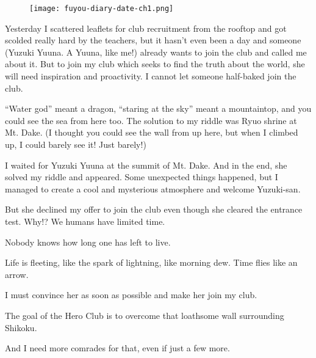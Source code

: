 \begin{center}
\begin{graphpaperBox}[enhanced,box align=center,colframe=diaryborder,top=0mm,left=0mm,boxsep=0mm,width=0.7\textwidth]
\begin{wrapfigure}{l}{0.25\textwidth}
\texttt{[image: fuyou-diary-date-ch1.png]}
\end{wrapfigure}
\hspace{\textheight}
\begin{addmargin}[1em]{0em}

Yesterday I scattered leaflets for club recruitment from the rooftop and got scolded really hard by the teachers, but it hasn't even been a day and someone (Yuzuki Yuuna. A Yuuna, like me!) already wants to join the club and called me about it. But to join my club which seeks to find the truth about the world, she will need inspiration and proactivity. I cannot let someone half-baked join the club.
\end{addmargin}

\begin{addmargin}[1em]{0em}
\setlength{\parskip}{6pt}

``Water god'' meant a dragon, ``staring at the sky'' meant a mountaintop, and you could see the sea from here too. The solution to my riddle was Ryuo shrine at Mt. Dake. \textleftarrow{} (I thought you could see the wall from up here, but when I climbed up, I could barely see it! Just barely!)

I waited for Yuzuki Yuuna at the summit of Mt. Dake. And in the end, she solved my riddle and appeared. Some unexpected things happened, but I managed to create a cool and mysterious atmosphere and welcome Yuzuki-san.

But she declined my offer to join the club even though she cleared the entrance test. Why!? We humans have limited time.

Nobody knows how long one has left to live.

Life is fleeting, like the spark of lightning, like morning dew. Time flies like an arrow.

I must convince her as soon as possible and make her join my club.

The goal of the Hero Club is to overcome that loathsome wall surrounding Shikoku.

And I need more comrades for that, even if just a few more.
\end{addmargin}

\end{graphpaperBox}
\end{center}
